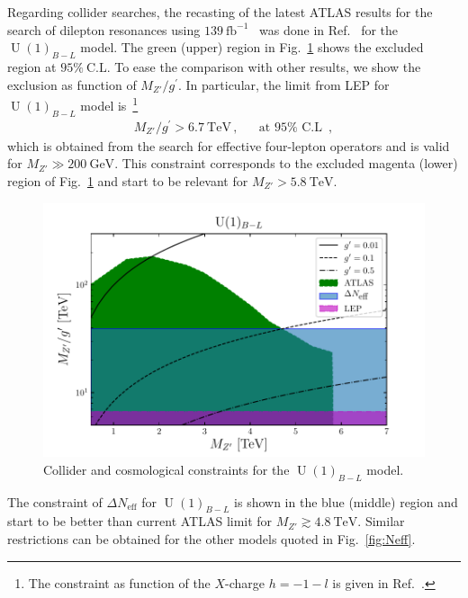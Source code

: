 \documentclass[12pt]{article}
\begin{document}
Regarding collider searches, the recasting of the latest ATLAS results for the search of dilepton resonances using $139\ \text{fb}^{-1}$~\cite{Aad:2019fac} was done
in Ref.~\cite{Chiang:2019ajm} for the $\operatorname{U}(1)_{B-L}$ model.
The green (upper) region in Fig.~\ref{fig:u1blc} shows the excluded region at $95\%\ \text{C.L.}$ To ease the comparison with other results, we show the exclusion as function of $M_{Z'}/g^{\prime}$. In particular, the limit from LEP for $\operatorname{U}(1)_{B-L}$ model is~\cite{Carena:2004xs,Heeck:2014zfa}\footnote{The constraint as function of the $X$-charge $h=-1-l$ is given in Ref.~\cite{Okada:2016tci}. }
\begin{align} 
  M_{Z'}/g^{\prime}>6.7\ \text{TeV}\,,&&\text{at $95\%$ C.L }\,,
\end{align}
which is obtained from the search for effective four-lepton operators and is valid for $M_{Z'}\gg 200\ \text{GeV}$. This constraint corresponds to the excluded magenta (lower) region of Fig.~\ref{fig:u1blc} and start to be relevant for $M_{Z'}>5.8\ \text{TeV}$.

\begin{figure}
    \centering
    \includegraphics[scale=1.0]{u1blc}
    \caption{Collider and cosmological constraints for the $\operatorname{U}(1)_{B-L}$ model.}
    \label{fig:u1blc}
\end{figure}

The constraint of $\Delta N_{\text{eff}}$ for $\operatorname{U}(1)_{B-L}$ is shown in the blue (middle) region and start to be better than current ATLAS limit for $M_{Z'}\gtrsim 4.8\ \text{TeV}$. Similar restrictions can be obtained for the other models quoted in Fig.~\ref{fig:Neff}.
\end{document}
